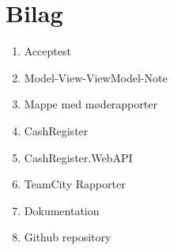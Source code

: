 \chapter{Bilag}
\begin{enumerate}
	\item Acceptest
	\item Model-View-ViewModel-Note
	\item Mappe med møderapporter
	\item CashRegister
	\item CashRegister.WebAPI
	\item TeamCity Rapporter
	\item Dokumentation
	\item Github repository
\end{enumerate}
